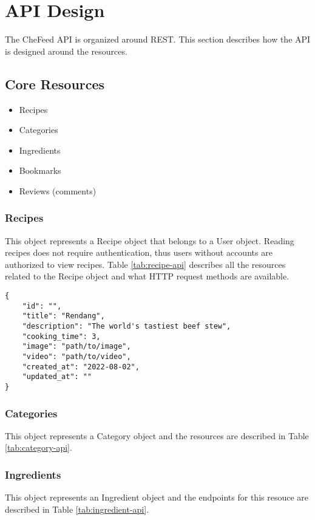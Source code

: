 \section{API Design}
The CheFeed API is organized around REST. This section describes how the API is designed around the resources.

\subsection{Core Resources}
\begin{itemize}
    \item Recipes
    \item Categories
    \item Ingredients
    \item Bookmarks
    \item Reviews (comments)
\end{itemize}

\subsubsection{Recipes}
This object represents a Recipe object that belongs to a User object. Reading recipes does not require authentication, thus users without accounts are authorized to view recipes. Table \ref{tab:recipe-api} describes all the resources related to the Recipe object and what HTTP request methods are available.

\lstset{language=json}
\lstset{caption=The Recipe example object}
\begin{lstlisting}
{
    "id": "",
    "title": "Rendang",
    "description": "The world's tastiest beef stew",
    "cooking_time": 3,
    "image": "path/to/image",
    "video": "path/to/video",
    "created_at": "2022-08-02",
    "updated_at": ""
}
\end{lstlisting}



\subsubsection{Categories}
This object represents a Category object and the resources are described in Table \ref{tab:category-api}.



\subsubsection{Ingredients}
This object represents an Ingredient object and the endpoints for this resouce are described in Table \ref{tab:ingredient-api}.

